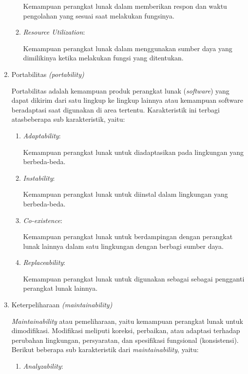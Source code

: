 \begin{enumerate}
\begin{enumerate}[label=\alph*)]
		Kemampuan perangkat lunak dalam memberikan respon dan waktu
		pengolahan yang sesuai saat melakukan fungsinya.
    \item \textit{Resource Utilization}:
    
		Kemampuan perangkat lunak dalam menggunakan sumber daya yang
		dimilikinya ketika melakukan fungsi yang ditentukan.

	\end{enumerate}

	\item Portabilitas \textit{(portability)}
	
	Portabilitas adalah kemampuan produk perangkat lunak (\textit{software}) yang dapat dikirim dari satu lingkup ke lingkup lainnya atau kemampuan software beradaptasi saat digunakan di area tertentu. Karakteristik ini terbagi atasbeberapa sub karakteristik, yaitu:

	\begin{enumerate}[label=\alph*)]
    \item \textit{Adaptability}:
    
		Kemampuan perangkat lunak untuk diadaptasikan pada lingkungan yang
		berbeda-beda.
    \item \textit{Instability}:
    
		Kemampuan perangkat lunak untuk diinstal dalam lingkungan yang
		berbeda-beda.
    \item \textit{Co-existence}:
    
		Kemampuan perangkat lunak untuk berdampingan dengan perangkat
		lunak lainnya dalam satu lingkungan dengan berbagi sumber daya. 
    \item \textit{Replaceability}:
    
		Kemampuan perangkat lunak untuk digunakan sebagai sebagai pengganti
		perangkat lunak lainnya.

	\end{enumerate}
	
	\item Keterpeliharaan \textit{(maintainability)}
	
	\textit{Maintainability} atau pemeliharaan, yaitu kemampuan perangkat lunak untuk dimodifikasi. Modifikasi meliputi koreksi, perbaikan, atau adaptasi terhadap perubahan lingkungan, persyaratan, dan spesifikasi fungsional (konsistensi). Berikut beberapa sub karakteristik dari \textit{maintainability}, yaitu:

	\begin{enumerate}[label=\alph*)]
    \item \textit{Analyzability}:
    

\end{enumerate}
\end{enumerate}
